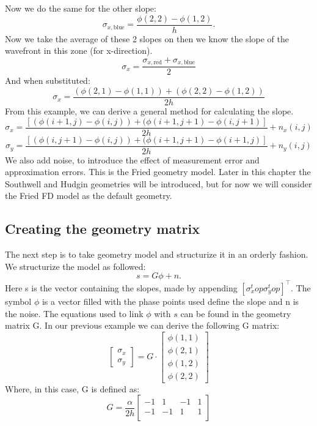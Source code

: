 \documentclass{article}
\begin{document}
Now we do the same for the other slope:
$$ \sigma_{x,\text{blue}} = \frac{\phi(2,2) - \phi(1,2)}{h}. $$
Now we take the average of these 2 slopes on then we know the slope of the wavefront in this zone (for x-direction).
$$ \sigma_x = \frac{\sigma_{x,\text{red}}+\sigma_{x,\text{blue}}}{2}$$
And when substituted:
$$ \sigma_x = \frac{(\phi(2,1) - \phi(1,1))+(\phi(2,2) - \phi(1,2))}{2h}$$
From this example, we can derive a general method for calculating the slope. 
$$ \sigma_x = \frac{[(\phi(i+1,j)-\phi(i,j))+(\phi(i+1,j+1)-\phi(i,j+1)]}{2h} + n_x(i,j)$$
$$ \sigma_y = \frac{[(\phi(i,j+1)-\phi(i,j))+(\phi(i+1,j+1)-\phi(i+1,j)]}{2h} + n_y(i,j)$$
We also add noise, to introduce the effect of measurement error and approximation errors.
This is the Fried geometry model. Later in this chapter the Southwell and Hudgin geometries will be introduced, but for now we will consider the Fried FD model as the default geometry.

\subsection{Creating the geometry matrix}
The next step is to take geometry model and structurize it in an orderly fashion. We structurize the model as followed:
$$ s = G\phi + n.$$  
Here s is the vector containing the slopes, made by appending $[\sigma_x^top \sigma_y^top]^\top$. The symbol $\phi$ is a vector filled with the phase points used define the slope and n is the noise. The equations used to link $\phi$ with $s$ can be found in the geometry matrix G. In our previous example we can derive the following G matrix:
$$ 
\begin{bmatrix}
\sigma_x \\
\sigma_y
\end{bmatrix} 
=
G
\cdot
\begin{bmatrix}
\phi(1,1) \\
\phi(2,1) \\
\phi(1,2) \\
\phi(2,2) 
\end{bmatrix}
$$
Where, in this case, G is defined as:
$$
G
=
\frac{\alpha}{2h}
\begin{bmatrix}
-1 & 1 & -1 & 1 \\
-1 & -1 & 1 & 1 \\
\end{bmatrix}
$$
\end{document}
